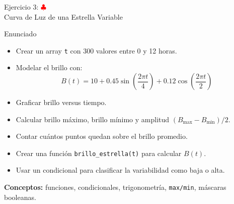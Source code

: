 \documentclass[10pt]{beamer}
\begin{document}
\begin{frame}[shrink=5]{Ejercicio 3: \hfill \textcolor{red}{$\clubsuit$} \\ Curva de Luz de una Estrella Variable}
  \begin{block}{Enunciado}
    \begin{itemize}
      \item Crear un array \texttt{t} con 300 valores entre 0 y 12 horas.
      \item Modelar el brillo con:
        \[
          B(t)=10+0.45\sin\left(\frac{2\pi t}{4}\right)+0.12\cos\left(\frac{2\pi t}{2}\right)
        \]
      \item Graficar brillo versus tiempo.
      \item Calcular brillo máximo, brillo mínimo y amplitud \((B_{\max}-B_{\min})/2\).
      \item Contar cuántos puntos quedan sobre el brillo promedio.
      \item Crear una función \texttt{brillo\_estrella(t)} para calcular \(B(t)\).
      \item Usar un condicional para clasificar la variabilidad como baja o alta.
    \end{itemize}
  \end{block}
  \textbf{Conceptos:} funciones, condicionales, trigonometría, \texttt{max/min}, máscaras booleanas.
\end{frame}
\end{document}
